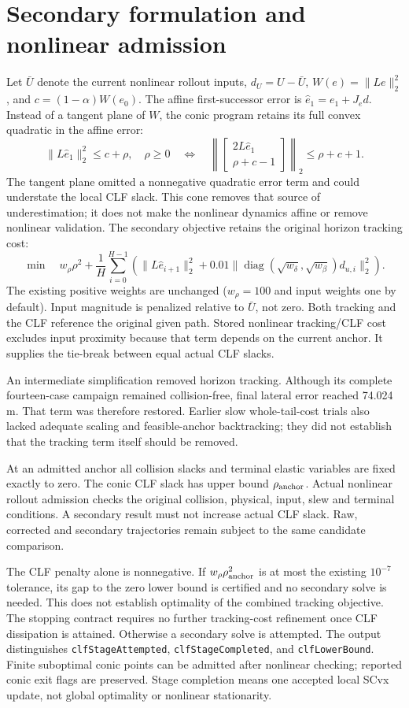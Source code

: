 \documentclass[11pt]{article}
\begin{document}
\section{Secondary formulation and nonlinear admission}
Let $\bar U$ denote the current nonlinear rollout inputs, $d_U=U-\bar U$,
$W(e)=\|Le\|_2^2$, and $c=(1-\alpha)W(e_0)$.
The affine first-successor error is $\widehat e_1=e_1+J_ed$.
Instead of a tangent plane of $W$, the conic program retains its full convex
quadratic in the affine error:
\[
\|L\widehat e_1\|_2^2\le c+\rho,\quad \rho\ge0
\quad\Longleftrightarrow\quad
\left\|\begin{bmatrix}2L\widehat e_1\\\rho+c-1\end{bmatrix}\right\|_2
\le\rho+c+1.
\]
The tangent plane omitted a nonnegative quadratic error term and could
understate the local CLF slack. This cone removes that source of underestimation;
it does not make the nonlinear dynamics affine or remove nonlinear validation.
The secondary objective retains the original horizon tracking cost:
\[
\min\quad w_\rho\rho^2+\frac{1}{H}\sum_{i=0}^{H-1}
\left(\|L\widehat e_{i+1}\|_2^2+0.01
\|\operatorname{diag}(\sqrt{w_\delta},\sqrt{w_\beta})d_{u,i}\|_2^2\right).
\]
The existing positive weights are unchanged ($w_\rho=100$ and input weights
one by default). Input magnitude is penalized relative to $\bar U$, not zero.
Both tracking and the CLF reference the original given path. Stored nonlinear
tracking/CLF cost excludes input proximity because that term depends on the
current anchor. It supplies the tie-break between equal actual CLF slacks.

An intermediate simplification removed horizon tracking. Although its complete
fourteen-case campaign remained collision-free, final lateral error reached
74.024 m. That term was therefore restored. Earlier slow whole-tail-cost trials
also lacked adequate scaling and feasible-anchor backtracking; they did not
establish that the tracking term itself should be removed.

At an admitted anchor all collision slacks and terminal elastic variables
are fixed exactly to zero. The conic CLF slack has upper bound
$\rho_{\rm anchor}$. Actual nonlinear rollout admission checks the original
collision, physical, input, slew and terminal conditions. A secondary result
must not increase actual CLF slack. Raw, corrected and secondary trajectories
remain subject to the same candidate comparison.

The CLF penalty alone is nonnegative. If
$w_\rho\rho_{\rm anchor}^2$ is at most the existing $10^{-7}$ tolerance,
its gap to the zero lower bound is certified and no secondary solve is needed.
This does not establish optimality of the combined tracking objective.
The stopping contract requires no further tracking-cost refinement once CLF
dissipation is attained. Otherwise a secondary solve is attempted.
The output distinguishes \texttt{clfStageAttempted},
\texttt{clfStageCompleted}, and \texttt{clfLowerBound}.
Finite suboptimal conic points can be admitted after nonlinear checking;
reported conic exit flags are preserved. Stage completion means one accepted
local SCvx update, not global optimality or nonlinear stationarity.
\end{document}
